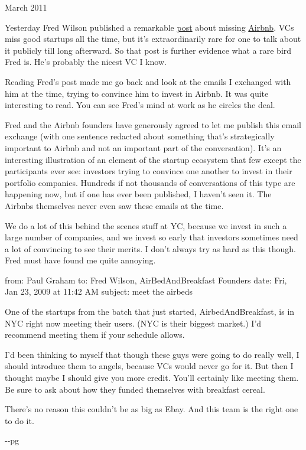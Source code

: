 March 2011

Yesterday Fred Wilson published a remarkable
\href{http://avc.com/2011/03/airbnb}{post} about missing
\href{http://airbnb.com}{Airbnb}. VCs miss good startups all the time,
but it's extraordinarily rare for one to talk about it publicly till
long afterward. So that post is further evidence what a rare bird Fred
is. He's probably the nicest VC I know.

Reading Fred's post made me go back and look at the emails I exchanged
with him at the time, trying to convince him to invest in Airbnb. It was
quite interesting to read. You can see Fred's mind at work as he circles
the deal.

Fred and the Airbnb founders have generously agreed to let me publish
this email exchange (with one sentence redacted about something that's
strategically important to Airbnb and not an important part of the
conversation). It's an interesting illustration of an element of the
startup ecosystem that few except the participants ever see: investors
trying to convince one another to invest in their portfolio companies.
Hundreds if not thousands of conversations of this type are happening
now, but if one has ever been published, I haven't seen it. The Airbnbs
themselves never even saw these emails at the time.

We do a lot of this behind the scenes stuff at YC, because we invest in
such a large number of companies, and we invest so early that investors
sometimes need a lot of convincing to see their merits. I don't always
try as hard as this though. Fred must have found me quite annoying.

from: Paul Graham to: Fred Wilson, AirBedAndBreakfast Founders date:
Fri, Jan 23, 2009 at 11:42 AM subject: meet the airbeds

One of the startups from the batch that just started,
AirbedAndBreakfast, is in NYC right now meeting their users. (NYC is
their biggest market.) I'd recommend meeting them if your schedule
allows.

I'd been thinking to myself that though these guys were going to do
really well, I should introduce them to angels, because VCs would never
go for it. But then I thought maybe I should give you more credit.
You'll certainly like meeting them. Be sure to ask about how they funded
themselves with breakfast cereal.

There's no reason this couldn't be as big as Ebay. And this team is the
right one to do it.

-\/-pg

